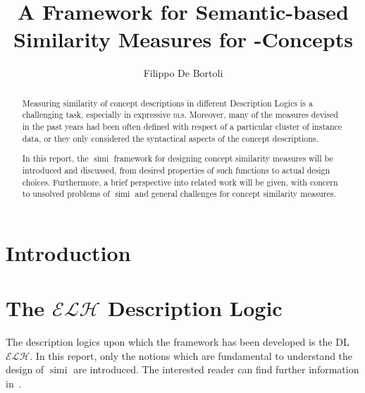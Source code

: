 \documentclass[]{llncs}
\title{A Framework for Semantic-based Similarity Measures for \mathcal{ELH}-Concepts}
\author{Filippo De Bortoli}
\institute{European Master's Programme in Computational Logic, TU Dresden}%
\DeclareMathOperator{\simi}{simi}
\newcommand{\elh}{\(\mathcal{ELH}{}\)}
\newcommand{\dl}{\textsc{dl}}
\begin{document}
  \maketitle

  \begin{abstract}
    Measuring similarity of concept descriptions in different Description Logics is a challenging task, especially in expressive \dl{}s.
    Moreover, many of the measures devised in the past years had been often defined with respect of a particular cluster of instance data, or they only considered the syntactical aspects of the concept descriptions.

    In this report, the \(\simi\) framework for designing concept similarity measures will be introduced and discussed, from desired properties of such functions to actual design choices.
    Furthermore, a brief perspective into related work will be given, with concern to unsolved problems of \(\simi\) and general challenges for concept similarity measures.
  \end{abstract}

  \section{Introduction}




  \section{The \(\mathcal{ELH}\) Description Logic}
  The description logics upon which the framework has been developed is the
  DL \elh.
  In this report, only the notions which are fundamental to understand the design of \(\simi\) are introduced. The interested reader can find further information in~\cite{DLbook}.
\end{document}
